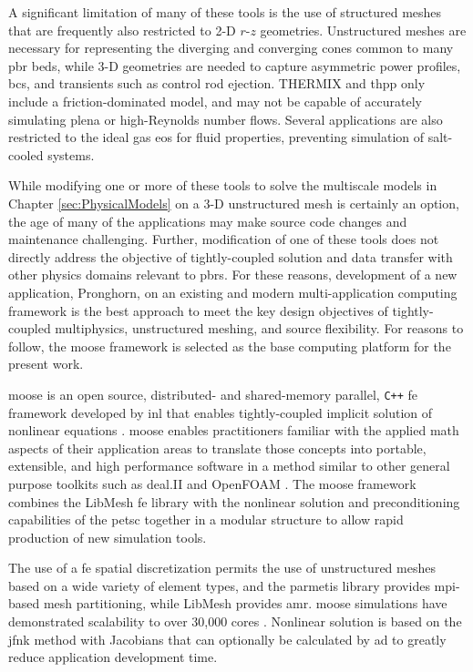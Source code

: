 A significant limitation of many of these tools is the use of structured meshes that are frequently also restricted to 2-D $r$-$z$ geometries. Unstructured meshes are necessary for representing the diverging and converging cones common to many \gls{pbr} beds, while 3-D geometries are needed to capture asymmetric power profiles, \glspl{bc}, and transients such as control rod ejection. THERMIX and \gls{thpp} only include a friction-dominated model, and may not be capable of accurately simulating plena or high-Reynolds number flows. Several applications are also restricted to the ideal gas \gls{eos} for fluid properties, preventing simulation of salt-cooled systems. 

While modifying one or more of these tools to solve the multiscale models in Chapter \ref{sec:PhysicalModels} on a 3-D unstructured mesh is certainly an option, the age of many of the applications may make source code changes and maintenance challenging. Further, modification of one of these tools does not directly address the objective of tightly-coupled solution and data transfer with other physics domains relevant to \glspl{pbr}. For these reasons, development of a new application, Pronghorn, on an existing and modern multi-application computing framework is the best approach to meet the key design objectives of tightly-coupled multiphysics, unstructured meshing, and source flexibility. For reasons to follow, the \gls{moose} framework is selected as the base computing platform for the present work.

\gls{moose} is an open source, distributed- and shared-memory parallel, \texttt{C++} \gls{fe} framework developed by \gls{inl} that enables tightly-coupled implicit solution of nonlinear equations \cite{gaston,moose}. \gls{moose} enables practitioners familiar with the applied math aspects of their application areas to translate those concepts into portable, extensible, and high performance software in a method similar to other general purpose toolkits such as deal.II \cite{dealII91} and OpenFOAM \cite{openfoam}. The \gls{moose} framework combines the LibMesh \gls{fe} library \cite{libMeshPaper} with the nonlinear solution and preconditioning capabilities of the \gls{petsc} together in a modular structure to allow rapid production of new simulation tools. 

The use of a \gls{fe} spatial discretization permits the use of unstructured meshes based on a wide variety of element types, and the \gls{parmetis} library provides \gls{mpi}-based mesh partitioning, while LibMesh provides \gls{amr}. \gls{moose} simulations have demonstrated scalability to over 30,000 cores \cite{kong}. Nonlinear solution is based on the \gls{jfnk} method with Jacobians that can optionally be calculated by \gls{ad} to greatly reduce application development time. 

